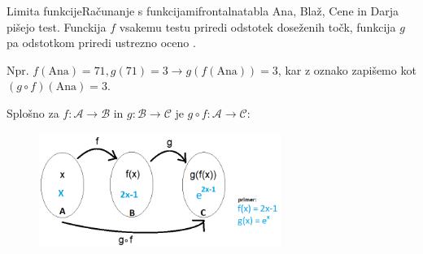 \begin{priprava}{}{}{Limita funkcije}{Računanje s funkcijami}{frontalna}{tabla}
Ana, Blaž, Cene in Darja pišejo test. Funckija $ f $ vsakemu testu priredi odstotek doseženih točk, funkcija $ g $ pa odstotkom priredi ustrezno oceno .

Npr. $ f(\text{Ana}) = 71, g(71) = 3 \rightarrow g(f(\text{Ana})) = 3 $, kar z oznako zapišemo kot $ (g \circ f)(\text{Ana}) = 3$.

\newpage

Splošno za $ f: \mathcal A \longrightarrow \mathcal B $ in $ g: \mathcal B \longrightarrow \mathcal C $ je $ g \circ f: \mathcal A \longrightarrow \mathcal C $:

\begin{figure}[h]
    \centering
    \includegraphics[width=0.7\textwidth]{slike/kompozitum.png}
\end{figure}


    
\end{priprava}